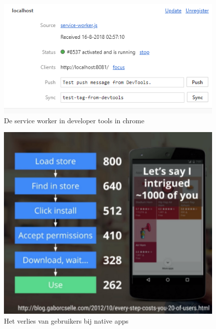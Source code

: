 \documentclass[fleqn,a4paper,12pt]{book}
\begin{document}
\begin{figure}
	\includegraphics[scale=0.75]{img/swDev.png}
	\caption{De service worker in developer tools in chrome}
	\label{fig:swDev}
\end{figure}

\begin{figure}
	\includegraphics[scale=0.75]{img/appDropOff.png}
	\caption{Het verlies van gebruikers bij native apps}
	\label{fig:appDropOff}
\end{figure}

\listoftables
\end{document}
